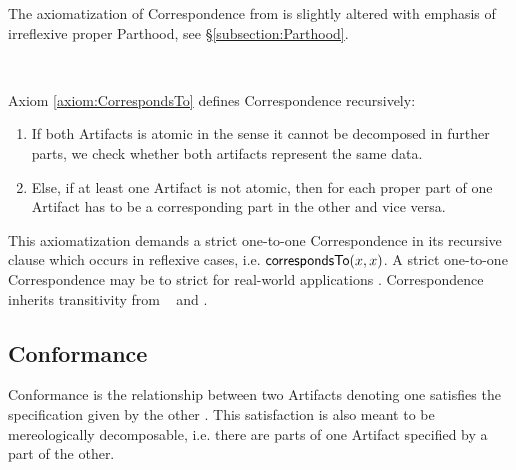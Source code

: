 The axiomatization of \gls{Correspondence} from \cite{DBLP:conf/modelsward/HeinzLV17} is slightly altered with emphasis of irreflexive proper \gls{Parthood}, see §\ref{subsection:Parthood}.
\begin{axiom}[\correspondsTo]
\label{axiom:CorrespondsTo}
~\newline
{}
\end{axiom}
Axiom \ref{axiom:CorrespondsTo} defines \gls{Correspondence} recursively:
\begin{enumerate}[align=left,label=\textbf{Case \Roman*},ref={\Roman*}]
\item
If both \glspl{Artifact} is atomic in the sense it cannot be decomposed in further parts, we check whether both artifacts represent the same data.

\item
Else, if at least one \gls{Artifact} is not atomic, then for each proper part of one \gls{Artifact} has to be a corresponding part in the other and vice versa.
\end{enumerate}
This axiomatization demands a strict one-to-one \gls{Correspondence} in its recursive clause which occurs in reflexive cases, i.e. $\textsf{correspondsTo}(x,x)$.
A strict one-to-one \gls{Correspondence} may be to strict for real-world applications \cite{DBLP:conf/sle/Lammel16}.
\Gls{Correspondence} inherits transitivity from \represents~ and \properPartOf.

\subsection{Conformance}
\label{subsection:Conformance}
\Gls{Conformance} is the relationship between two \glspl{Artifact} denoting one satisfies the specification given by the other \cite{DBLP:conf/modelsward/HeinzLV17}.
This satisfaction is also meant to be mereologically decomposable, i.e. there are parts of one \gls{Artifact} specified by a part of the other.


